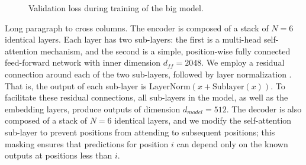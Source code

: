 \begin{figure}[t]\centering
{}
\caption{Validation loss during training of the big model.}\label{fig:curve}
\end{figure}

Long paragraph to cross columns. The encoder is composed of a stack of $N = 6$ identical layers. Each layer has two sub-layers: the first is a multi-head self-attention mechanism, and the second is a simple, position-wise fully connected feed-forward network with inner dimension $d_{ff} = 2048$. We employ a residual connection around each of the two sub-layers, followed by layer normalization \cite{ba2016}. That is, the output of each sub-layer is $\mathrm{LayerNorm}(x + \mathrm{Sublayer}(x))$. To facilitate these residual connections, all sub-layers in the model, as well as the embedding layers, produce outputs of dimension $d_{model} = 512$. The decoder is also composed of a stack of $N = 6$ identical layers, and we modify the self-attention sub-layer to prevent positions from attending to subsequent positions; this masking ensures that predictions for position $i$ can depend only on the known outputs at positions less than $i$.
